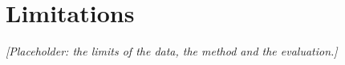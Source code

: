 \section*{Limitations}

\textit{[Placeholder: the limits of the data, the method and the evaluation.]}
